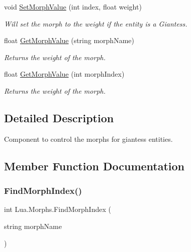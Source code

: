 \begin{DoxyCompactItemize}
void \mbox{\hyperlink{class_lua_1_1_morphs_a55a34c72668e0bd4ec86865163a89bd0}{Set\+Morph\+Value}} (int index, float weight)
\begin{DoxyCompactList}\small\item\em Will set the morph to the weight if the entity is a Giantess. \end{DoxyCompactList}\item 
float \mbox{\hyperlink{class_lua_1_1_morphs_aa2abe4bd241377c0589799e32bb6fe55}{Get\+Morph\+Value}} (string morph\+Name)
\begin{DoxyCompactList}\small\item\em Returns the weight of the morph. \end{DoxyCompactList}\item 
float \mbox{\hyperlink{class_lua_1_1_morphs_a18a50bb7510eb2c33f285a0cccbee9a4}{Get\+Morph\+Value}} (int morph\+Index)
\begin{DoxyCompactList}\small\item\em Returns the weight of the morph. \end{DoxyCompactList}\end{DoxyCompactItemize}


\subsection{Detailed Description}
Component to control the morphs for giantess entities. 



\subsection{Member Function Documentation}
\mbox{\label{class_lua_1_1_morphs_aef69d4abbbf5f61ff1a2d4fe50737b4b}} 
\subsubsection{\texorpdfstring{FindMorphIndex()}{FindMorphIndex()}}
{\footnotesize\ttfamily int Lua.\+Morphs.\+Find\+Morph\+Index (\begin{DoxyParamCaption}\item[{string}]{morph\+Name }\end{DoxyParamCaption})}



